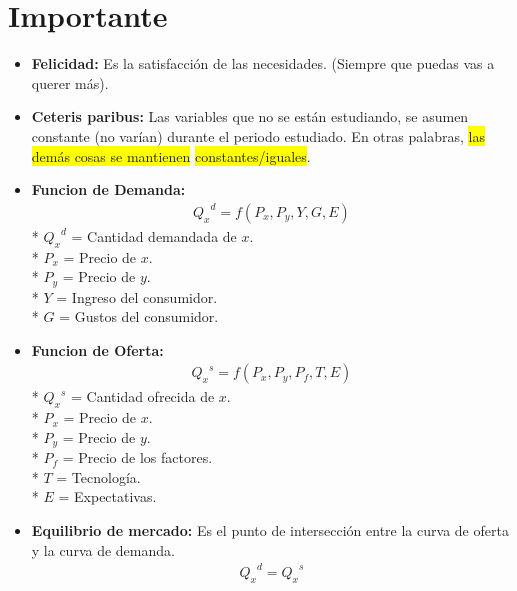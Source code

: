 \documentclass{templateNote}
\newcommand{\destacar}[1]{ \colorbox{yellow}{#1}}
\begin{document}
\portada
\margenes %

\section{Importante}
\begin{itemize}
    \item \textbf{Felicidad:} Es la satisfacción de las necesidades. (Siempre que puedas vas a querer más).
    
    \item \textbf{Ceteris paribus:} Las variables que no se están estudiando, se asumen constante (no varían) durante el periodo estudiado. En otras palabras, \destacar{las demás cosas se mantienen} \destacar{constantes/iguales}.

    \item \textbf{Funcion de Demanda:} 
    \begin{align*}
        {Q_x}^d = f(P_x, P_y, Y, G, E)
    \end{align*}
* ${Q_x}^d$ = Cantidad demandada de $x$.\\
* $P_x$ = Precio de $x$.\\
* $P_y$ = Precio de $y$.\\
* $Y$ = Ingreso del consumidor.\\
* $G$ = Gustos del consumidor.\\
    
    \item \textbf{Funcion de Oferta:}
    \begin{align*}
        {Q_x}^s = f(P_x, P_y, P_f, T, E)
    \end{align*}
* ${Q_x}^s$ = Cantidad ofrecida de $x$.\\
* $P_x$ = Precio de $x$.\\
* $P_y$ = Precio de $y$.\\
* $P_f$ = Precio de los factores.\\
* $T$ = Tecnología.\\
* $E$ = Expectativas.\\

    \item \textbf{Equilibrio de mercado:} Es el punto de intersección entre la curva de oferta y la curva de demanda.\\
    \begin{align*}
        {Q_x}^d = {Q_x}^s
    \end{align*}
    

\end{itemize}
\end{document}
